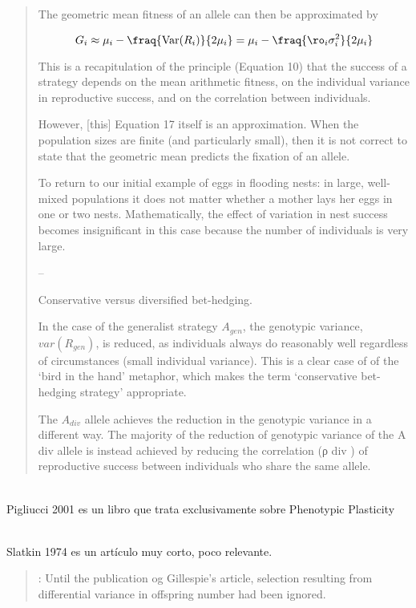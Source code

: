 \documentclass[a4paper,10pt]{article}
\begin{document}
\begin{quotation}
    The geometric mean fitness of an allele can then be approximated by
    
    \begin{equation}
    G_i \approx \mu_i - \fraq{\text{Var}(R_i)}{2\mu_i} = \mu_i - \fraq{\ro_i \sigma_i^2}{2\mu_i}
    \end{equation}
    
    This is a recapitulation of the principle (Equation 10) that the success of a strategy depends on the mean arithmetic fitness, on the individual variance in reproductive success, and on the correlation between individuals.
    
    However, [this] Equation 17 itself is an approximation.
    When the population sizes are finite (and particularly small), then it is not correct to state that the geometric mean predicts the fixation of an allele.
    
    To return to our initial example of eggs in flooding nests: in large, well-mixed populations it does not matter whether a mother lays her eggs in one or two nests.
    Mathematically, the effect of variation in nest success becomes insignificant in this case because the number of individuals is very large.
    
    --
    
    Conservative versus diversified bet-hedging.
    
    In the case of the generalist strategy $A_{gen}$, the genotypic variance, $var(R_{gen})$, is reduced, as individuals always do reasonably well regardless of circumstances (small individual variance).
    This is a clear case of of the ‘bird in the hand’ metaphor, which makes the term ‘conservative bet-hedging strategy’ appropriate.
    
    The $A_{div}$ allele achieves the reduction in the genotypic variance in a different way.
    The majority of the reduction of genotypic variance of the A div allele is instead achieved by reducing the correlation (ρ div ) of reproductive success between individuals who share the same allele.
    
\end{quotation}


\\

Pigliucci 2001 \cite{pigliucci2001-plasticity} es un libro que trata exclusivamente sobre Phenotypic Plasticity

\\

Slatkin 1974 es un artículo muy corto, poco relevante. 
\begin{quotation} \cite{slatkin1974-evolutionaryBets}:
    Until the publication og Gillespie's article, selection resulting from differential variance in offspring number had been ignored.
\end{quotation}
\end{document}
